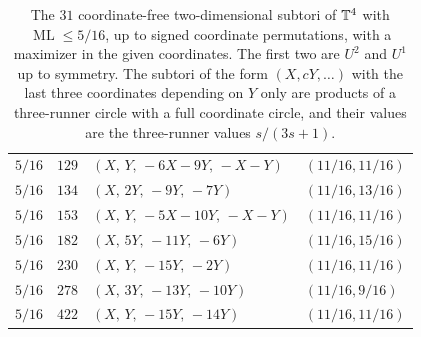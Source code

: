 \documentclass[12pt]{amsart}
\theoremstyle{definition}\newtheorem{definition}[theorem]{Definition}
\theoremstyle{remark}\newtheorem{remark}[theorem]{Remark}
\newcommand{\ML}{\operatorname{ML}}
\newcommand{\Uone}{U^{1}}\newcommand{\Utwo}{U^{2}}
\begin{document}
\begin{table}[H]
\begin{tabular}{l r l l}
$5/16$ & $129$ & $(X,\,Y,\,-6X-9Y,\,-X-Y)$ & $(11/16,11/16)$ \\
$5/16$ & $134$ & $(X,\,2Y,\,-9Y,\,-7Y)$ & $(11/16,13/16)$ \\
$5/16$ & $153$ & $(X,\,Y,\,-5X-10Y,\,-X-Y)$ & $(11/16,11/16)$ \\
$5/16$ & $182$ & $(X,\,5Y,\,-11Y,\,-6Y)$ & $(11/16,15/16)$ \\
$5/16$ & $230$ & $(X,\,Y,\,-15Y,\,-2Y)$ & $(11/16,11/16)$ \\
$5/16$ & $278$ & $(X,\,3Y,\,-13Y,\,-10Y)$ & $(11/16,9/16)$ \\
$5/16$ & $422$ & $(X,\,Y,\,-15Y,\,-14Y)$ & $(11/16,11/16)$ \\
\bottomrule
\end{tabular}
\caption{The $31$ coordinate-free two-dimensional subtori of $\mathbb T^4$ with $\ML\le5/16$, up to signed coordinate permutations, with a maximizer in the given coordinates. The first two are $\Utwo$ and $\Uone$ up to symmetry. The subtori of the form $(X,cY,\ldots)$ with the last three coordinates depending on $Y$ only are products of a three-runner circle with a full coordinate circle, and their values are the three-runner values $s/(3s+1)$.}
\label{tab:tori}
\end{table}
\end{document}

